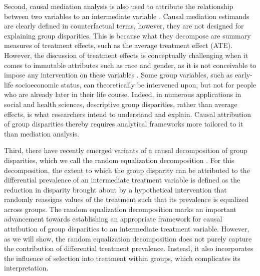 \documentclass[12pt,a4paper]{article}
\begin{document}
Second, causal mediation analysis is also used to attribute the relationship between two variables to an intermediate variable \citep{vanderweele_explanation_2015}. Causal mediation estimands are clearly defined in counterfactual terms, however, they are not designed for explaining group disparities. This is because what they decompose are summary measures of treatment effects, such as the average treatment effect (ATE). However, the discussion of treatment effects is conceptually challenging when it comes to immutable attributes such as race and gender, as it is not conceivable to impose any intervention on these variables \citep{rubin_estimating_1974, holland_statistics_1986}. Some group variables, such as early-life socioeconomic status, can theoretically be intervened upon, but not for people who are already later in their life course. Indeed, in numerous applications in social and health sciences, descriptive group disparities, rather than average effects, is what researchers intend to understand and explain. Causal attribution of group disparities thereby requires analytical frameworks more tailored to it than mediation analysis.  

Third, there have recently emerged variants of a causal decomposition of group disparities, which we call the random equalization decomposition \citep{vanderweele_causal_2014, jackson_decomposition_2018, lundberg_gap-closing_2022}. For this decomposition, the extent to which the group disparity can be attributed to the differential prevalence of an intermediate treatment variable is defined as the reduction in disparity brought about by a hypothetical intervention that randomly reassigns values of the treatment such that its prevalence is equalized across groups. The random equalization decomposition marks an important advancement towards establishing an appropriate framework for causal attribution of group disparities to an intermediate treatment variable. However, as we will show, the random equalization decomposition does not purely capture the contribution of differential treatment prevalence. Instead, it also incorporates the influence of selection into treatment within groups, which complicates its interpretation.
\end{document}
